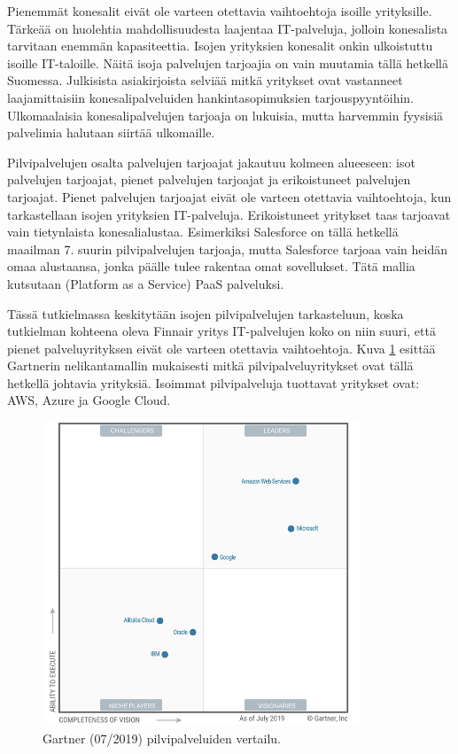 Pienemmät konesalit eivät ole varteen otettavia vaihtoehtoja isoille yrityksille. Tärkeää on huolehtia mahdollisuudesta laajentaa IT-palveluja, jolloin konesalista tarvitaan enemmän kapasiteettia. Isojen yrityksien konesalit onkin ulkoistuttu isoille IT-taloille. Näitä isoja palvelujen tarjoajia on vain muutamia tällä hetkellä Suomessa. Julkisista asiakirjoista selviää mitkä yritykset ovat vastanneet laajamittaisiin konesalipalveluiden hankintasopimuksien tarjouspyyntöihin.\citep{nurmijarvi} Ulkomaalaisia konesalipalvelujen tarjoaja on lukuisia, mutta harvemmin fyysisiä palvelimia halutaan siirtää ulkomaille.

Pilvipalvelujen osalta palvelujen tarjoajat jakautuu kolmeen alueeseen: isot palvelujen tarjoajat, pienet palvelujen tarjoajat ja erikoistuneet palvelujen tarjoajat. Pienet palvelujen tarjoajat eivät ole varteen otettavia vaihtoehtoja, kun tarkastellaan isojen yrityksien IT-palveluja. Erikoistuneet yritykset taas tarjoavat vain tietynlaista konesalialustaa. Esimerkiksi Salesforce on tällä hetkellä maailman 7. suurin pilvipalvelujen tarjoaja, mutta Salesforce tarjoaa vain heidän omaa alustaansa, jonka päälle tulee rakentaa omat sovellukset. Tätä mallia kutsutaan (Platform as a Service) PaaS palveluksi.\citep{top_cloud}

Tässä tutkielmassa keskitytään isojen pilvipalvelujen tarkasteluun, koska tutkielman kohteena oleva Finnair yritys IT-palvelujen koko on niin suuri, että pienet palveluyrityksen eivät ole varteen otettavia vaihtoehtoja. Kuva \ref{gartner} esittää Gartnerin nelikantamallin mukaisesti mitkä pilvipalveluyritykset ovat tällä hetkellä johtavia yrityksiä. Isoimmat pilvipalveluja tuottavat yritykset ovat: AWS, Azure ja Google Cloud.

\begin{figure}[ht]
\centering 
\includegraphics[width=0.85\textwidth]{figures/CloudIaaS.png}
\caption{Gartner (07/2019) pilvipalveluiden vertailu. \citep{top_cloud}}\label{gartner}
\end{figure}

